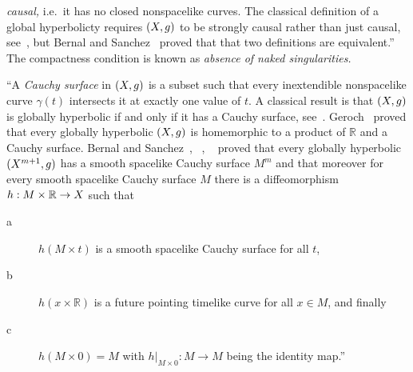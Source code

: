 \documentclass[12pt,reqno,a4paper]{amsart}
\begin{document}
        {\it causal,\/} i.e.~it has no closed nonspacelike curves. The
        classical definition of a global hyperbolicty requires $(\ss,g)$ to
        be strongly causal rather than just causal, see~\cite{HawkingEllis},
        but Bernal and Sanchez~\cite[Theorem 3.2]{BernalSanchezCausal}
        proved that that two definitions are equivalent.''
        The compactness condition is
        known as {\em absence of naked singularities.}
        \par\hfill\par
        ``A {\it Cauchy surface\/} in $(\ss, g)$ is a subset such that every
        inextendible nonspacelike curve $\gamma(t)$ intersects it at exactly
        one value of $t.$ A classical result is that $(\ss, g)$ is globally
        hyperbolic if and only if it has a Cauchy surface,
        see~\cite[pages 211-212]{HawkingEllis}. Geroch~\cite{Geroch} proved
        that every globally hyperbolic $(\ss, g)$ is homemorphic to a product
        of $\mathbb{R}$ and a Cauchy surface. Bernal and
        Sanchez~\cite[Theorem 1]{BernalSanchez},
        ~\cite[Theorem 1.1]{BernalSanchezMetricSplitting},
        ~\cite[Theorem 1.2]{BernalSanchezFurther} proved that every globally
        hyperbolic $(\ss^{m+1}, g)$ has a smooth spacelike Cauchy surface
        $M^m$ and that moreover for every smooth spacelike Cauchy surface
        $M$ there is a diffeomorphism  $h:M\times \mathbb{R}\to \ss$ such that
        \begin{description}
            \item[a]
                $h(M\times t)$ is a smooth spacelike Cauchy surface for all $t$,
            \item[b]
                $h(x\times \mathbb{R})$ is a future pointing timelike
                curve for all $x\in M$, and finally
            \item[c]
                $h(M\times 0)=M$ with $h|_{M\times 0}:M\to M$
                being the identity map.''
        \end{description}
\end{document}
